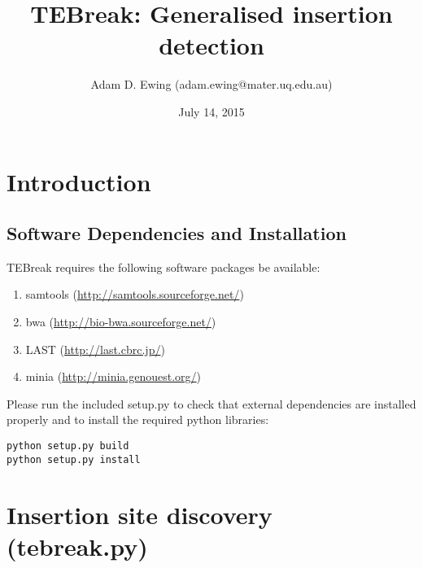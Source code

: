 \documentclass[letterpaper,11pt]{article}
\title{TEBreak: Generalised insertion detection}
\author{Adam D. Ewing (adam.ewing@mater.uq.edu.au)}
\begin{document}
 \date{July 14, 2015}
 \maketitle

\section{Introduction}
\subsection{Software Dependencies and Installation}
TEBreak requires the following software packages be available:

\begin{enumerate}
  \item samtools (\url{http://samtools.sourceforge.net/})
  \item bwa (\url{http://bio-bwa.sourceforge.net/})
  \item LAST (\url{http://last.cbrc.jp/})
  \item minia (\url{http://minia.genouest.org/})
\end{enumerate}

Please run the included setup.py to check that external dependencies are installed properly and to install the required python libraries:

\begin{verbatim}
python setup.py build
python setup.py install
\end{verbatim}


\section{Insertion site discovery (tebreak.py)}
\end{document}
